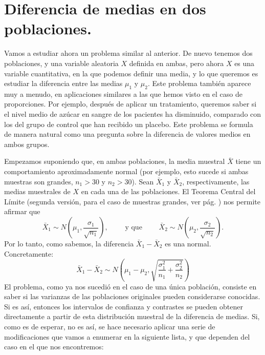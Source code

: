 \section{Diferencia de medias en dos poblaciones.}
\label{cap09:sec:diferenciaMediasDosPoblaciones}

Vamos a estudiar ahora un problema similar al anterior. De nuevo tenemos dos poblaciones, y una variable aleatoria $X$ definida en ambas, pero ahora $X$ es una variable cuantitativa, en la que podemos definir una media, y  lo que queremos es estudiar la diferencia entre las medias $\mu_1$ y $\mu_2$. Este problema también aparece muy a menudo, en aplicaciones similares a las que hemos visto en el caso de proporciones. Por ejemplo, después de aplicar un tratamiento, queremos saber si el nivel medio de azúcar en sangre de los pacientes ha disminuido, comparado con los del grupo de control que han recibido un placebo. Este problema se formula de manera natural como una pregunta sobre la diferencia de valores medios en ambos grupos.

Empezamos suponiendo que, en ambas poblaciones, la media muestral $\bar X$ tiene un comportamiento aproximadamente normal (por ejemplo, esto sucede si ambas muestras son grandes, $n_1>30$ y $n_2>30$). Sean $\bar X_1$ y $\bar X_2$, respectivamente, las medias muestrales de $X$ en cada una de las poblaciones.  El Teorema Central del Límite (segunda versión, para el caso de muestras grandes, ver pág. \pageref{cap06:teo:TCLsegundaVersion}) nos permite afirmar que
    \[\bar X_1\sim N\left(\mu_1,\dfrac{\sigma_1}{\sqrt{n_1}}\right),\qquad\mbox{ y que }\qquad \bar X_2\sim N\left(\mu_2,\dfrac{\sigma_2}{\sqrt{n_2}}\right).\]
Por lo tanto, como sabemos, la diferencia $\bar X_1-\bar X_2$ es una normal. Concretamente:
    \[\bar X_1-\bar X_2\sim N\left(\mu_1-\mu_2,\sqrt{\dfrac{\sigma_1^2}{n_1}+\dfrac{\sigma_2^2}{n_2}}\right)\]
El problema, como ya nos sucedió en el caso de una única población, consiste en saber si las varianzas de las poblaciones originales pueden considerarse conocidas. Si es así, entonces los intervalos de confianza y contrastes se pueden obtener directamente a partir de esta distribución muestral de la diferencia de medias.  Si, como es de esperar, no es así, se hace necesario aplicar una serie de modificaciones que vamos a enumerar en la siguiente lista, y que dependen del caso en el que nos encontremos:
